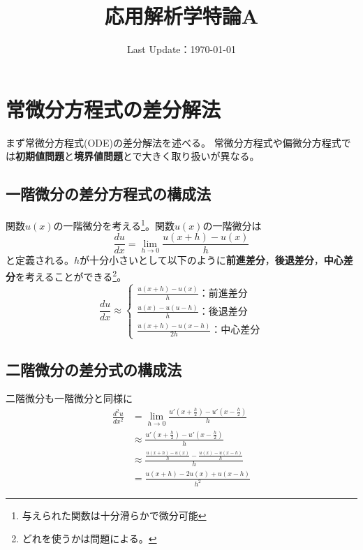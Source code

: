 \documentclass{jsreport}
\title{応用解析学特論A}
\date{Last Update：\today}
\begin{document}
\maketitle


\section{常微分方程式の差分解法}
	まず常微分方程式(ODE)の差分解法を述べる。
	常微分方程式や偏微分方程式では\textbf{初期値問題}と\textbf{境界値問題}とで大きく取り扱いが異なる。
\subsection{一階微分の差分方程式の構成法}
	関数$u(x)$の一階微分を考える\footnote{与えられた関数は十分滑らかで微分可能}。関数$u(x)$の一階微分は
\begin{equation*}
	\frac{du}{dx}= \lim_{h\to 0} \frac{u(x+ h)- u(x)}{h}
\end{equation*}
	と定義される。$h$が十分小さいとして以下のように\textbf{前進差分}，\textbf{後退差分}，\textbf{中心差分}を考えることができる\footnote{どれを使うかは問題による。}。
\begin{equation*}
	\frac{du}{dx}\approx 
\begin{cases}
	\frac{u(x+ h)- u(x)}{h}：前進差分\\
	\frac{u(x)- u(u- h)}{h}：後退差分\\
	\frac{u(x+ h)- u(x- h)}{2h}：中心差分
\end{cases}
\end{equation*}

\subsection{二階微分の差分式の構成法}
	二階微分も一階微分と同様に
\begin{align*}
	\frac{d^2u}{dx^2}
	&= \lim_{h\to 0} \frac{u'(x+ \frac{h}{2})- u'(x- \frac{h}{2})}{h}\\
	&\approx \frac{u'(x+ \frac{h}{2})- u'(x- \frac{h}{2})}{h}\\
	&\approx \frac{\frac{u(x+ h)- u(x)}{h}- \frac{u(x)- u(x- h)}{h}}{h}\\
	&= \frac{u(x+ h)- 2u(x)+ u(x- h)}{h^2}
\end{align*}
\end{document}
